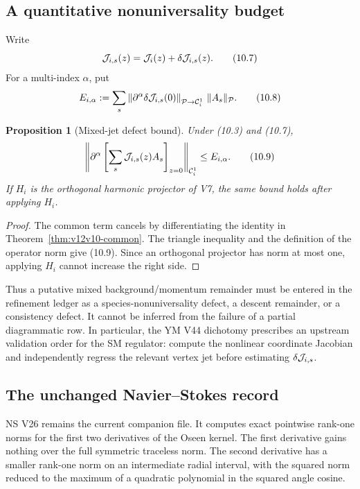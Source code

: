 \documentclass[11pt]{article}
\newtheorem{proposition}[theorem]{Proposition}
\theoremstyle{remark}
\begin{document}
\subsection{A quantitative nonuniversality budget}

Write
\[
 {\cal J}_{i,s}(z)={\cal J}_i(z)+\delta{\cal J}_{i,s}(z).
                                                               \tag{10.7}
\]
For a multi-index \(\alpha\), put
\[
 E_{i,\alpha}:=
 \sum_s
 \left\|
 \partial^\alpha\delta{\cal J}_{i,s}(0)
 \right\|_{\mathcal P\to\mathcal C_i^1}\,\|A_s\|_{\mathcal P}.
                                                               \tag{10.8}
\]

\begin{proposition}[Mixed-jet defect bound]
\label{prop:v12v10-jet-bound}
Under (10.3) and (10.7),
\[
 \left\|
 \partial^\alpha\left[
   \sum_s{\cal J}_{i,s}(z)A_s
 \right]_{z=0}
 \right\|_{\mathcal C_i^1}
 \le E_{i,\alpha}.                                          \tag{10.9}
\]
If \(H_i\) is the orthogonal harmonic projector of V7, the same
bound holds after applying \(H_i\).
\end{proposition}

\begin{proof}
The common term cancels by differentiating the identity in
Theorem~\ref{thm:v12v10-common}.  The triangle inequality and the
definition of the operator norm give (10.9).  Since an orthogonal
projector has norm at most one, applying \(H_i\) cannot increase the
right side.
\end{proof}

Thus a putative mixed background/momentum remainder must be entered
in the refinement ledger as a species-nonuniversality defect, a
descent remainder, or a consistency defect.  It cannot be inferred
from the failure of a partial diagrammatic row.  In particular, the
YM V44 dichotomy prescribes an upstream validation order for the SM
regulator: compute the nonlinear coordinate Jacobian and independently
regress the relevant vertex jet before estimating
\(\delta{\cal J}_{i,s}\).

\subsection{The unchanged Navier--Stokes record}

NS V26 remains the current companion file.  It computes exact
pointwise rank-one norms for the first two derivatives of the Oseen
kernel.  The first derivative gains nothing over the full symmetric
traceless norm.  The second derivative has a smaller rank-one norm
on an intermediate radial interval, with the squared norm reduced to
the maximum of a quadratic polynomial in the squared angle cosine.
\end{document}
